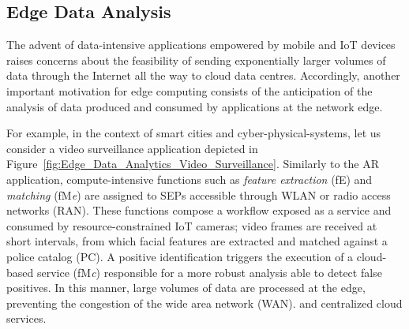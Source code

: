 \subsection{Edge Data Analysis}\label{sec:SEP_EDA}

The advent of data-intensive applications empowered by mobile and IoT devices raises concerns about the feasibility of sending exponentially larger volumes of data through the Internet all the way to cloud data centres. Accordingly, another important motivation for edge computing consists of the anticipation of the analysis of data produced and consumed by applications at the network edge. 



For example, in the context of smart cities and cyber-physical-systems, let us consider a video surveillance application 
depicted in Figure~\ref{fig:Edge_Data_Analytics_Video_Surveillance}. Similarly to the AR application, compute-intensive functions such as \textit{feature extraction} (fE) and \textit{matching} (fM\textit{e}) are assigned to SEPs accessible through WLAN or radio access networks (RAN).
These functions compose a workflow exposed as a service and consumed by resource-constrained IoT cameras; video frames are received at short intervals, from which facial features are extracted and matched against a police catalog (PC). A positive identification triggers the execution of a cloud-based service (fM\textit{c}) responsible for a more robust analysis able to detect false positives. In this manner, large volumes of data are processed at the edge, preventing the congestion of the wide area network (WAN). and centralized cloud services.


